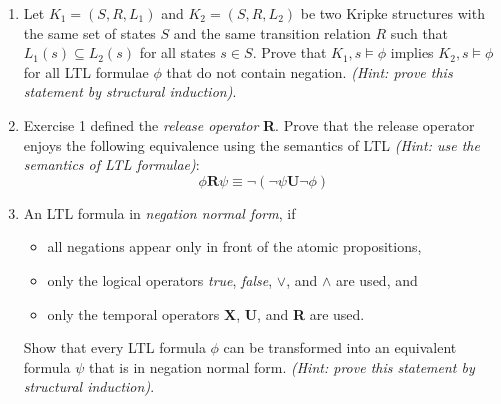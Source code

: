 
\begin{enumerate}

\item Let $K_1 = (S, R, L_1)$ and  $K_2 = (S, R, L_2)$ be two Kripke structures with the same set of states $S$ and the same transition relation $R$ such that $L_1(s) \subseteq L_2(s)$ for all states $s \in S$.
    Prove that $K_1,s \models \phi$ implies $K_2,s \models \phi$ for all LTL formulae $\phi$ that do not contain negation.
    \emph{(Hint: prove this statement by structural induction)}.

\item

Exercise 1 defined the \emph{release operator} \textbf{R}.
Prove that the release operator enjoys the following equivalence using the semantics of LTL \emph{(Hint: use the semantics of LTL formulae)}:
\begin{displaymath}
    \phi \mathbf{R} \psi \equiv \neg(\neg \psi \mathbf{U} \neg \phi)
\end{displaymath}

\item

An LTL formula in \emph{negation normal form}, if
\begin{itemize}
\item all negations appear only in front of the atomic propositions,
\item only the logical operators \emph{true}, \emph{false}, $\vee$, and $\wedge$ are used, and
\item only the temporal operators \textbf{X}, \textbf{U}, and \textbf{R} are used.
\end{itemize}

Show that every LTL formula $\phi$ can be transformed into an equivalent formula $\psi$ that is in negation normal form.
\emph{(Hint: prove this statement by structural induction)}.

\end{enumerate}